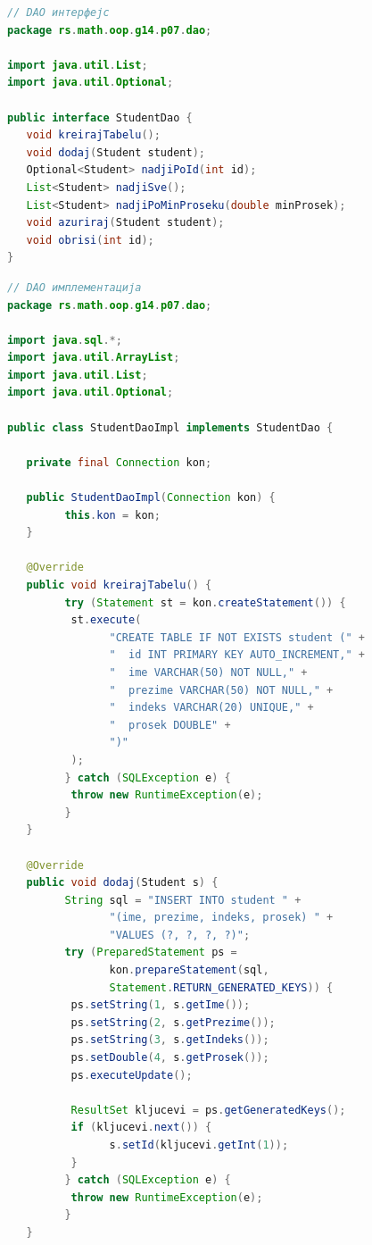 \begin{lstlisting}[language=Java]
// DAO интерфејс
package rs.math.oop.g14.p07.dao;
 
import java.util.List;
import java.util.Optional;
 
public interface StudentDao {
   void kreirajTabelu();
   void dodaj(Student student);
   Optional<Student> nadjiPoId(int id);
   List<Student> nadjiSve();
   List<Student> nadjiPoMinProseku(double minProsek);
   void azuriraj(Student student);
   void obrisi(int id);
}
\end{lstlisting}


\begin{lstlisting}[language=Java]
// DAO имплементација
package rs.math.oop.g14.p07.dao;
 
import java.sql.*;
import java.util.ArrayList;
import java.util.List;
import java.util.Optional;
 
public class StudentDaoImpl implements StudentDao {
 
   private final Connection kon;
 
   public StudentDaoImpl(Connection kon) {
         this.kon = kon;
   }
 
   @Override
   public void kreirajTabelu() {
         try (Statement st = kon.createStatement()) {
          st.execute(
                "CREATE TABLE IF NOT EXISTS student (" +
                "  id INT PRIMARY KEY AUTO_INCREMENT," +
                "  ime VARCHAR(50) NOT NULL," +
                "  prezime VARCHAR(50) NOT NULL," +
                "  indeks VARCHAR(20) UNIQUE," +
                "  prosek DOUBLE" +
                ")"
          );
         } catch (SQLException e) {
          throw new RuntimeException(e);
         }
   }
 
   @Override
   public void dodaj(Student s) {
         String sql = "INSERT INTO student " +
                "(ime, prezime, indeks, prosek) " +
                "VALUES (?, ?, ?, ?)";
         try (PreparedStatement ps =
                kon.prepareStatement(sql,
                Statement.RETURN_GENERATED_KEYS)) {
          ps.setString(1, s.getIme());
          ps.setString(2, s.getPrezime());
          ps.setString(3, s.getIndeks());
          ps.setDouble(4, s.getProsek());
          ps.executeUpdate();
 
          ResultSet kljucevi = ps.getGeneratedKeys();
          if (kljucevi.next()) {
                s.setId(kljucevi.getInt(1));
          }
         } catch (SQLException e) {
          throw new RuntimeException(e);
         }
   }
 

\end{lstlisting}
